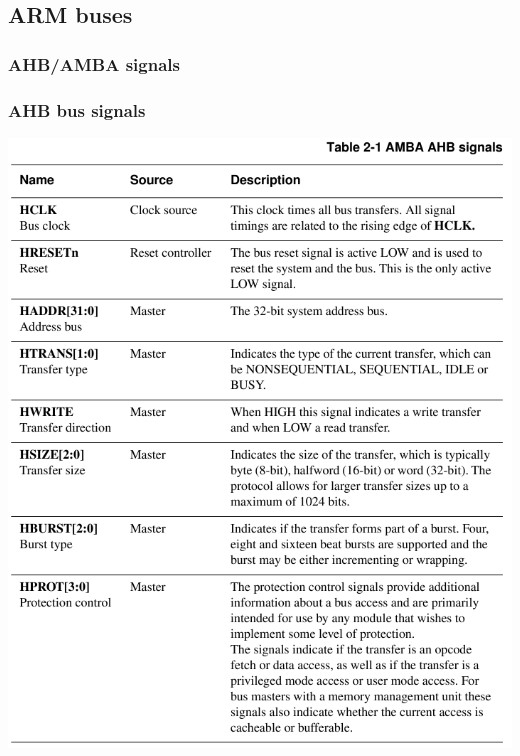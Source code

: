 \documentclass[a4paper]{scrartcl}
\begin{document}
    \subsection{ARM buses}
        \subsubsection{AHB/AMBA signals}
        \subsubsection*{AHB bus signals}
        \centering\includegraphics[scale=0.4]{amba1}
\end{document}
